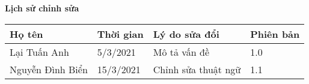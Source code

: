 \documentclass[./main.tex]{subfiles}
\begin{document}
	\begin{center}
		\Large{\textbf{Lịch sử chỉnh sửa}}
		\begin{table}[H]
			\begin{tabular}{|l|l|l|l|}
				\hline
				\textbf{Họ tên}  & \textbf{Thời gian} & \textbf{Lý do sửa đổi} & \textbf{Phiên bản} \\ \hline
				Lại Tuấn Anh     & 5/3/2021           & Mô tả vấn đề           & 1.0                \\ \hline
				Nguyễn Đình Biển & 15/3/2021          & Chỉnh sửa thuật ngữ    & 1.1                \\ \hline
			\end{tabular}
		\end{table}
	\end{center}
	
\end{document}
